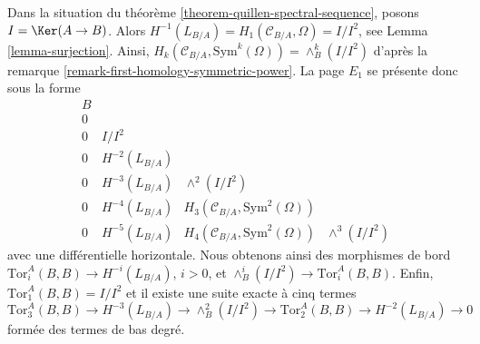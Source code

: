 \begin{remark}
\label{remark-elucidate-ss}
Dans la situation du théorème \ref{theorem-quillen-spectral-sequence}, posons
$I = \Ker(A \to B)$. Alors
$H^{-1}(L_{B/A}) = H_1(\mathcal{C}_{B/A}, \Omega) = I/I^2$, see
Lemma \ref{lemma-surjection}.
Ainsi,
$H_k(\mathcal{C}_{B/A}, \text{Sym}^k(\Omega)) = \wedge^k_B(I/I^2)$ d'après la
remarque \ref{remark-first-homology-symmetric-power}. La page $E_1$ se présente
donc sous la forme
$$
\begin{matrix}
B \\
0 \\
0 & I/I^2 \\
0 & H^{-2}(L_{B/A}) \\
0 & H^{-3}(L_{B/A}) & \wedge^2(I/I^2) \\
0 & H^{-4}(L_{B/A}) & H_3(\mathcal{C}_{B/A}, \text{Sym}^2(\Omega)) \\
0 & H^{-5}(L_{B/A}) & H_4(\mathcal{C}_{B/A}, \text{Sym}^2(\Omega)) &
\wedge^3(I/I^2)
\end{matrix}
$$
avec une différentielle horizontale. Nous obtenons ainsi des morphismes de bord
$\text{Tor}_i^A(B, B) \to H^{-i}(L_{B/A})$, $i > 0$, et
$\wedge^i_B(I/I^2) \to \text{Tor}_i^A(B, B)$. Enfin,
$\text{Tor}_1^A(B, B) = I/I^2$ et il existe une suite exacte à cinq termes
$$
\text{Tor}_3^A(B, B) \to H^{-3}(L_{B/A}) \to \wedge^2_B(I/I^2) \to
\text{Tor}_2^A(B, B) \to H^{-2}(L_{B/A}) \to 0
$$
formée des termes de bas degré.
\end{remark}

